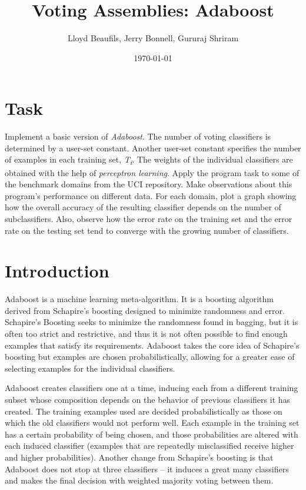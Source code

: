 \documentclass{article}
\title{Voting Assemblies: Adaboost}
\author{Lloyd Beaufils, Jerry Bonnell, Gururaj Shriram}
\date{\today}
\begin{document}
\maketitle

\section{Task}

Implement a basic version of \textit{Adaboost}. The number of voting classifiers is determined by a user-set constant. Another user-set constant specifies the number of examples in each training set, \textit{T\textsubscript{i}}. The weights of the individual classifiers are obtained with the help of \textit{perceptron learning}. Apply the program task to some of the benchmark domains from the UCI repository. Make observations about this program's performance on different data. For each domain, plot a graph showing how the overall accuracy of the resulting classifier depends on the number of subclassifiers. Also, observe how the error rate on the training set and the error rate on the testing set tend to converge with the growing number of classifiers.

\section{Introduction}

Adaboost is a machine learning meta-algorithm. It is a boosting algorithm derived from Schapire's boosting designed to minimize randomness and error. Schapire's Boosting seeks to minimize the randomness found in bagging, but it is often too strict and restrictive, and thus it is not often possible to find enough examples that satisfy its requirements. Adaboost takes the core idea of Schapire's boosting but examples are chosen probabilistically, allowing for a greater ease of selecting examples for the individual classifiers.

Adaboost creates classifiers one at a time, inducing each from a different training subset whose composition depends on the behavior of previous classifiers it has created. The training examples used are decided probabilistically as those on which the old classifiers would not perform well. Each example in the training set has a certain probability of being chosen, and those probabilities are altered with each induced classifier (examples that are repeatedly misclassified receive higher and higher probabilities). Another change from Schapire's boosting is that Adaboost does not stop at three classifiers -- it induces a great many classifiers and makes the final decision with weighted majority voting between them.
\end{document}
